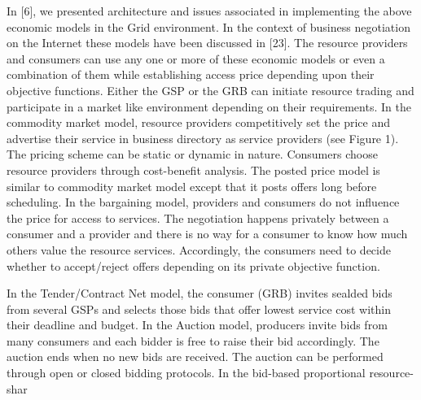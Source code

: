 \documentclass{article}
\begin{document}
In [6], we presented architecture and issues associated in implementing the above economic models in the Grid environment. In the context of business negotiation on the Internet these models have been discussed in [23]. The resource providers and consumers can use any one or more of these economic models or even a combination of them while establishing access price depending upon their objective functions. Either the GSP or the GRB can initiate resource trading and participate in a market like environment depending on their requirements. In the commodity market model, resource providers competitively set the price and advertise their service in business directory as service providers (see Figure 1). The pricing scheme can be static or dynamic in nature. Consumers choose resource providers through cost-benefit analysis. The posted price model is similar to commodity market model except that it posts offers long before scheduling. In the bargaining model, providers and consumers do not influence the price for access to services. The negotiation happens privately between a consumer and a provider and there is no way for a consumer to know how much others value the resource services. Accordingly, the consumers need to decide whether to accept/reject offers depending on its private objective function. 

In the Tender/Contract Net model, the consumer (GRB) invites sealded bids from several GSPs and selects those bids that offer lowest service cost within their deadline and budget. In the Auction model, producers invite bids from many consumers and each bidder is free to raise their bid accordingly. The auction ends when no new bids are received. The auction can be performed through open or closed bidding protocols. In the bid-based proportional resource-shar

% 



\end{document}
